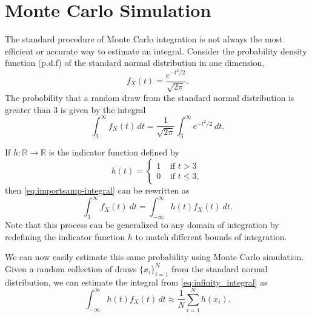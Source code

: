 
\section*{Monte Carlo Simulation} %

The standard procedure of Monte Carlo integration is not always the most efficient or accurate way to estimate an integral.
Consider the probability density function (p.d.f) of the standard normal distribution in one dimension,
\begin{equation}
f_X(t) = \frac{e^{-t^2/2}}{\sqrt{2\pi}}.
\label{eq:imsamp-standard-normal}
\end{equation}
The probability that a random draw from the standard normal distribution is greater than $3$ is given by the integral
\begin{equation}
\int_{3}^{\infty} f_X(t)\,dt = \frac{1}{\sqrt{2\pi}}\int_{3}^{\infty} e^{-t^2/2}\:dt.
\label{eq:importsamp-integral}
\end{equation}

If $h: \mathbb{R} \rightarrow \mathbb{R}$ is the indicator function defined by
\[
h(t) = \begin{cases}
1 & \text{ if } t > 3 \\
0 & \text{ if } t \leq 3,
\end{cases}
\]
then \eqref{eq:importsamp-integral} can be rewritten as
\begin{equation}
\int_{3}^{\infty} f_X(t)\:dt = \int_{-\infty}^{\infty} h(t)f_X(t)\:dt.
\label{eq:infinity_integral}
\end{equation}
Note that this process can be generalized to any domain of integration by redefining the indicator function $h$ to match different bounds of integration.

We can now easily estimate this same probability using Monte Carlo simulation.
Given a random collection of draws $\{x_i\}_{i=1}^N$ from the standard normal distribution, we can estimate the integral from \eqref{eq:infinity_integral} as
\begin{equation}
\int_{-\infty}^{\infty} h(t)f_X(t)\,dt \approx \frac{1}{N}\sum_{i = 1}^{N}h(x_i).
\label{eq:importsamp-estimator}
\end{equation}

